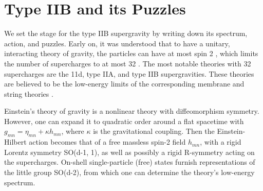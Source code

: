 \section{Type IIB and its Puzzles}
\label{sec:iib-puzzles}
We set the stage for the type IIB supergravity by writing down its spectrum, action, and puzzles.
Early on, it was understood that to have a unitary, interacting theory of gravity, the particles can have at most spin 2 \cite{Weinberg:1964ew,Weinberg:1965nx}, which limits the number of supercharges to at most 32 \cite{Nahm:1977tg}. 
The most notable theories with 32 supercharges are the 11d, type IIA, and type IIB supergravities. 
These theories are believed to be the low-energy limits of the corresponding membrane and string theories \cite{Green:2012oqa}.

Einstein's theory of gravity is a nonlinear theory with diffeomorphism symmetry.
However, one can expand it to quadratic order around a flat spacetime with $g_{mn} = \eta_{mn} + \kappa h_{mn}$, where $\kappa$ is the gravitational coupling.
Then the Einstein-Hilbert action becomes that of a free massless spin-2 field $h_{mn}$, with a rigid Lorentz symmetry SO(d-1, 1), as well as possibly a rigid R-symmetry acting on the supercharges.
On-shell single-particle (free) states furnish representations of the little group SO(d-2), from which one can determine the theory's low-energy spectrum.

